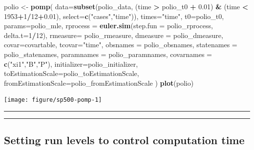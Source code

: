 \documentclass[]{article}
\newenvironment{Shaded}{\begin{snugshade}}{\end{snugshade}}
\newcommand{\KeywordTok}[1]{\textcolor[rgb]{0.13,0.29,0.53}{\textbf{#1}}}
\newcommand{\DataTypeTok}[1]{\textcolor[rgb]{0.13,0.29,0.53}{#1}}
\newcommand{\DecValTok}[1]{\textcolor[rgb]{0.00,0.00,0.81}{#1}}
\newcommand{\FloatTok}[1]{\textcolor[rgb]{0.00,0.00,0.81}{#1}}
\newcommand{\StringTok}[1]{\textcolor[rgb]{0.31,0.60,0.02}{#1}}
\newcommand{\OperatorTok}[1]{\textcolor[rgb]{0.81,0.36,0.00}{\textbf{#1}}}
\newcommand{\NormalTok}[1]{#1}
\begin{document}
\begin{Shaded}
\begin{Highlighting}[]
\NormalTok{polio <-}\StringTok{ }\KeywordTok{pomp}\NormalTok{(}
  \DataTypeTok{data=}\KeywordTok{subset}\NormalTok{(polio_data, }
\NormalTok{              (time }\OperatorTok{>}\StringTok{ }\NormalTok{polio_t0 }\OperatorTok{+}\StringTok{ }\FloatTok{0.01}\NormalTok{) }\OperatorTok{&}\StringTok{ }\NormalTok{(time }\OperatorTok{<}\StringTok{ }\DecValTok{1953}\OperatorTok{+}\DecValTok{1}\OperatorTok{/}\DecValTok{12}\OperatorTok{+}\FloatTok{0.01}\NormalTok{),   }
              \DataTypeTok{select=}\KeywordTok{c}\NormalTok{(}\StringTok{"cases"}\NormalTok{,}\StringTok{"time"}\NormalTok{)),}
  \DataTypeTok{times=}\StringTok{"time"}\NormalTok{,}
  \DataTypeTok{t0=}\NormalTok{polio_t0,}
  \DataTypeTok{params=}\NormalTok{polio_mle,}
  \DataTypeTok{rprocess =} \KeywordTok{euler.sim}\NormalTok{(}\DataTypeTok{step.fun =}\NormalTok{ polio_rprocess, }\DataTypeTok{delta.t=}\DecValTok{1}\OperatorTok{/}\DecValTok{12}\NormalTok{),}
  \DataTypeTok{rmeasure=}\NormalTok{ polio_rmeasure,}
  \DataTypeTok{dmeasure =}\NormalTok{ polio_dmeasure,}
  \DataTypeTok{covar=}\NormalTok{covartable,}
  \DataTypeTok{tcovar=}\StringTok{"time"}\NormalTok{,}
  \DataTypeTok{obsnames =}\NormalTok{ polio_obsnames,}
  \DataTypeTok{statenames =}\NormalTok{ polio_statenames,}
  \DataTypeTok{paramnames =}\NormalTok{ polio_paramnames,}
  \DataTypeTok{covarnames =} \KeywordTok{c}\NormalTok{(}\StringTok{"xi1"}\NormalTok{,}\StringTok{"B"}\NormalTok{,}\StringTok{"P"}\NormalTok{),}
  \DataTypeTok{initializer=}\NormalTok{polio_initializer,}
  \DataTypeTok{toEstimationScale=}\NormalTok{polio_toEstimationScale, }
  \DataTypeTok{fromEstimationScale=}\NormalTok{polio_fromEstimationScale}
\NormalTok{)}
\KeywordTok{plot}\NormalTok{(polio)}
\end{Highlighting}
\end{Shaded}

\begin{center}\texttt{[image: figure/sp500-pomp-1]} \end{center}

\begin{center}\rule{0.5\linewidth}{\linethickness}\end{center}

\begin{center}\rule{0.5\linewidth}{\linethickness}\end{center}

\subsection{Setting run levels to control computation
time}\label{setting-run-levels-to-control-computation-time}
\end{document}
